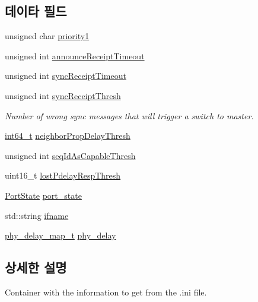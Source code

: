 \subsection*{데이타 필드}
\begin{DoxyCompactItemize}
\item 
unsigned char \hyperlink{struct_gptp_ini_parser_1_1gptp__cfg__t_aaaa084057ac150d5cfeaff1ccee422b8}{priority1}
\item 
unsigned int \hyperlink{struct_gptp_ini_parser_1_1gptp__cfg__t_a05905c66231ef6fc18d4208c42ce0702}{announce\+Receipt\+Timeout}
\item 
unsigned int \hyperlink{struct_gptp_ini_parser_1_1gptp__cfg__t_acdbb968dbfdc1d76285faa1973de3320}{sync\+Receipt\+Timeout}
\item 
unsigned int \hyperlink{struct_gptp_ini_parser_1_1gptp__cfg__t_a96a516505e2131562cadf9f96522afae}{sync\+Receipt\+Thresh}
\begin{DoxyCompactList}\small\item\em Number of wrong sync messages that will trigger a switch to master. \end{DoxyCompactList}\item 
\hyperlink{parse_8c_a67a9885ef4908cb72ce26d75b694386c}{int64\+\_\+t} \hyperlink{struct_gptp_ini_parser_1_1gptp__cfg__t_a8e4aae7b1201b03be78ac2ada6cd5d03}{neighbor\+Prop\+Delay\+Thresh}
\item 
unsigned int \hyperlink{struct_gptp_ini_parser_1_1gptp__cfg__t_ad640c0854e25c3347a8723f9a0f32edd}{seq\+Id\+As\+Capable\+Thresh}
\item 
uint16\+\_\+t \hyperlink{struct_gptp_ini_parser_1_1gptp__cfg__t_ab04b7c6ced77ef2b302011ce412ca781}{lost\+Pdelay\+Resp\+Thresh}
\item 
\hyperlink{ptptypes_8hpp_a679431f1afc75d7bb9e972c022e53672}{Port\+State} \hyperlink{struct_gptp_ini_parser_1_1gptp__cfg__t_ae66554126902ed959a3b296ddd3204e8}{port\+\_\+state}
\item 
std\+::string \hyperlink{struct_gptp_ini_parser_1_1gptp__cfg__t_a487996221bd46263f88d58f72a6d4db6}{ifname}
\item 
\hyperlink{common__port_8hpp_a3fdbc1f6eb18af9243571ba14c1e1f63}{phy\+\_\+delay\+\_\+map\+\_\+t} \hyperlink{struct_gptp_ini_parser_1_1gptp__cfg__t_afdea28a656b2ebb14b4bb2354f9d7601}{phy\+\_\+delay}
\end{DoxyCompactItemize}


\subsection{상세한 설명}
Container with the information to get from the .ini file. 

